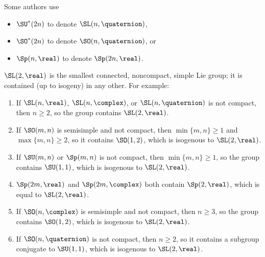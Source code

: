 \begin{terminology} \label{SOstarTerminology}
 Some authors use
 \begin{itemize}
 \item  $\SU^*(2n)$ to denote $\SL(n,\quaternion)$,
 \item $\SO^*(2n)$ to denote $\SO(n,\quaternion)$,
 or
 \item $\Sp(n,\real)$ to denote $\Sp(2n,\real)$.
 \end{itemize}
 \end{terminology}

\begin{rem} \label{SL2RinG}
 $\SL(2,\real)$ is the smallest connected, noncompact, simple
Lie group; it is contained (up to isogeny) in any other. For example:
 \begin{enumerate}
 
 \item If $\SL(n,\real)$, $\SL(n,\complex)$, or
$\SL(n,\quaternion)$ is not compact, then $n \ge 2$, so the group contains $\SL(2,\real)$.

 \item If $\SO(m,n)$ is semisimple and  not compact, then
$\min\{m,n\} \ge 1$ and $\max\{m,n\} \ge 2$, so it contains $\SO(1,2)$, which is isogenous to $\SL(2,\real)$.

 \item If $\SU(m,n)$ or $\Sp(m,n)$ is not compact, then $\min\{m,n\} \ge
1$, so the group contains $\SU(1,1)$, which is isogenous to $\SL(2,\real)$.
 
\item $\Sp(2m,\real)$ and $\Sp(2m,\complex)$ both contain $\Sp(2,\real)$, which is equal to $\SL(2,\real)$.

\item If $\SO(n,\complex)$ is semisimple and not compact, then $n \ge 3$, so the group contains $\SO(1,2)$, which is isogenous to $\SL(2,\real)$.

\item If $\SO(n,\quaternion)$ is not compact, then $n \ge 2$, so it contains a subgroup conjugate to $\SU(1,1)$, which is isogenous to $\SL(2,\real)$.

 \end{enumerate}
 \end{rem}


